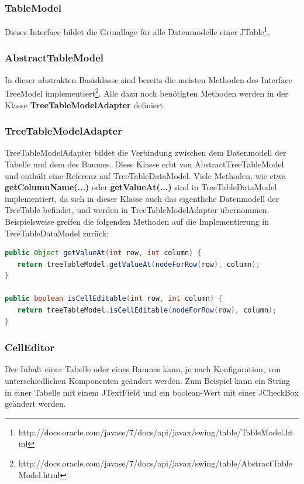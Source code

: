 \subsubsection*{TableModel}
Dieses Interface bildet die Grundlage für alle Datenmodelle einer JTable\footnote{http://docs.oracle.com/javase/7/docs/api/javax/swing/table/TableModel.html}.

\subsubsection*{AbstractTableModel}
In dieser abstrakten Basisklasse sind bereits die meisten Methoden des Interface TreeModel implementiert\footnote{http://docs.oracle.com/javase/7/docs/api/javax/swing/table/AbstractTableModel.html}. Alle dazu noch benötigten Methoden werden in der Klasse \textbf{TreeTableModelAdapter} definiert.

\subsubsection*{TreeTableModelAdapter}
TreeTableModelAdapter bildet die Verbindung zwischen dem Datenmodell der Tabelle und dem des Baumes. Diese Klasse erbt von AbstractTreeTableModel und enthält eine Referenz auf TreeTableDataModel. Viele Methoden, wie etwa \textbf{getColumnName(...)} oder \textbf{getValueAt(...)} sind in TreeTableDataModel implementiert, da sich in dieser Klasse auch das eigentliche Datenmodell der TreeTable befindet, und werden in TreeTableModelAdapter übernommen. Beispielsweise greifen die folgenden Methoden auf die Implementierung in TreeTableDataModel zurück:
\begin{lstlisting}[language=JAVA]
public Object getValueAt(int row, int column) {
   return treeTableModel.getValueAt(nodeForRow(row), column);
}

public boolean isCellEditable(int row, int column) {
   return treeTableModel.isCellEditable(nodeForRow(row), column);
}
\end{lstlisting}

\subsubsection*{CellEditor}

Der Inhalt einer Tabelle oder eines Baumes kann, je nach Konfiguration, von unterschiedlichen Komponenten geändert werden. Zum Beispiel kann ein String in einer Tabelle mit einem JTextField und ein boolean-Wert mit einer JCheckBox geändert werden.

